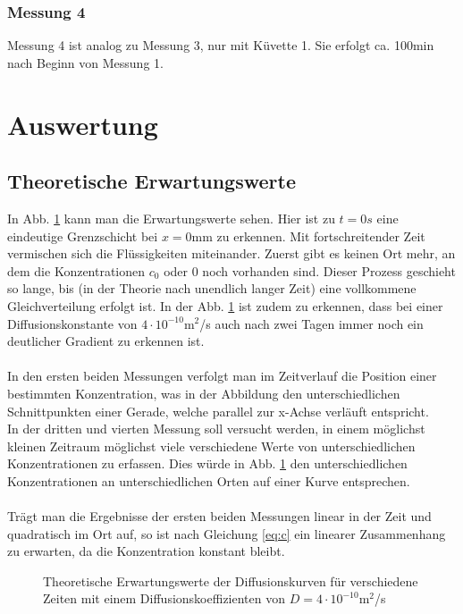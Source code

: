 \documentclass[12pt,a4paper,titlepage,headinclude,bibtotoc]{scrartcl}
\begin{document}
\subsubsection*{Messung 4}
Messung 4 ist analog zu Messung 3, nur mit Küvette 1.
Sie erfolgt ca. 100min nach Beginn von Messung 1.


\section{Auswertung}
\label{sec:auswertung}
\subsection{Theoretische Erwartungswerte}
In Abb. \ref{fig:diffkurvetheo} kann man die Erwartungswerte sehen.
Hier ist zu $t=0s$ eine eindeutige Grenzschicht bei $x=0$mm zu erkennen.
Mit fortschreitender Zeit vermischen sich die Flüssigkeiten miteinander.
Zuerst gibt es keinen Ort mehr, an dem die Konzentrationen $c_0$ oder $0$ noch vorhanden sind.
Dieser Prozess geschieht so lange, bis (in der Theorie nach unendlich langer Zeit) eine vollkommene Gleichverteilung erfolgt ist.
In der Abb. \ref{fig:diffkurvetheo} ist zudem zu erkennen, dass bei einer Diffusionskonstante von $4\cdot 10^{-10}$m$^2$/s auch nach zwei Tagen immer noch ein deutlicher Gradient zu erkennen ist.\\\\
In den ersten beiden Messungen verfolgt man im Zeitverlauf die Position einer bestimmten Konzentration, was in der Abbildung den unterschiedlichen Schnittpunkten einer Gerade, welche parallel zur x-Achse verläuft entspricht.\\
In der dritten und vierten Messung soll versucht werden, in einem möglichst kleinen Zeitraum möglichst viele verschiedene Werte von unterschiedlichen Konzentrationen zu erfassen.
Dies würde in Abb. \ref{fig:diffkurvetheo} den unterschiedlichen Konzentrationen an unterschiedlichen Orten auf einer Kurve entsprechen.\\\\
Trägt man die Ergebnisse der ersten beiden Messungen linear in der Zeit und quadratisch im Ort auf, so ist nach Gleichung \eqref{eq:c} ein linearer Zusammenhang zu erwarten, da die Konzentration konstant bleibt.

\begin{figure}[!h]
 \centering
 
\caption{Theoretische Erwartungswerte der Diffusionskurven für verschiedene Zeiten mit einem Diffusionskoeffizienten von $D=4\cdot 10^{-10}$m$^2$/s\label{fig:diffkurvetheo}}
\end{figure}
\end{document}
